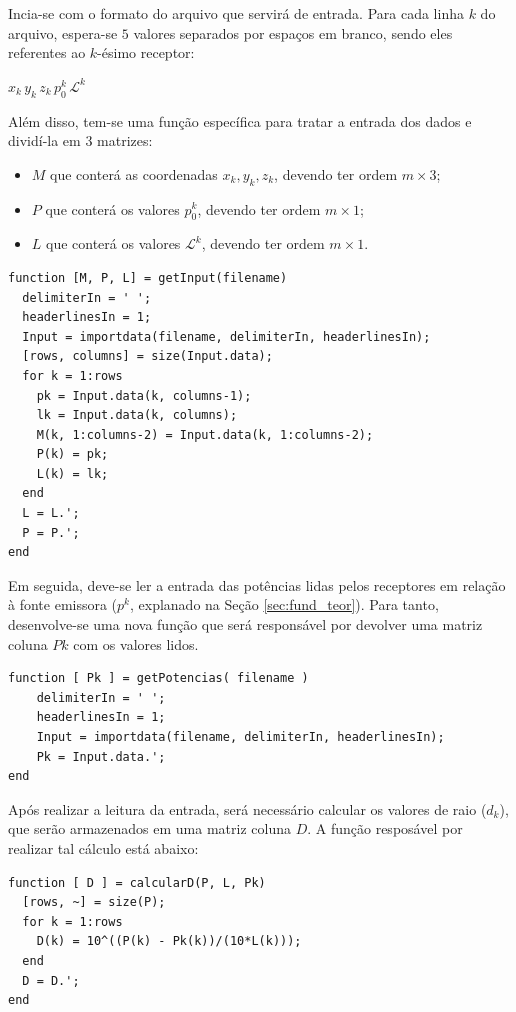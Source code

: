 	Incia-se com o formato do arquivo que servirá de entrada. Para cada linha $k$ do arquivo, espera-se
	$5$ valores separados por espaços em branco, sendo eles referentes ao $k$-ésimo receptor:

	$x_k\,y_k\,z_k\,p^k_0\,\mathcal{L}^k$

	Além disso, tem-se uma função específica para tratar a entrada dos dados e dividí-la em $3$ matrizes:
	\begin{itemize}
		\item $M$ que conterá as coordenadas $x_k, y_k, z_k$, devendo ter ordem $m\times3$;
		\item $P$ que conterá os valores $p^k_0$, devendo ter ordem $m\times1$;
		\item $L$ que conterá os valores $\mathcal{L}^k$, devendo ter ordem $m\times1$.
	\end{itemize}

	\begin{Verbatim}[fontsize=\footnotesize]
function [M, P, L] = getInput(filename)
  delimiterIn = ' ';
  headerlinesIn = 1;
  Input = importdata(filename, delimiterIn, headerlinesIn);
  [rows, columns] = size(Input.data);
  for k = 1:rows
    pk = Input.data(k, columns-1);
    lk = Input.data(k, columns);
    M(k, 1:columns-2) = Input.data(k, 1:columns-2);
    P(k) = pk;
    L(k) = lk;
  end
  L = L.';
  P = P.';
end
	\end{Verbatim}

	Em seguida, deve-se ler a entrada das potências lidas pelos receptores em relação à fonte emissora ($p^k$,
	explanado na Seção \ref{sec:fund_teor}). Para tanto, desenvolve-se uma nova função que será responsável
	por devolver uma matriz coluna $Pk$ com os valores lidos.

	\begin{Verbatim}[fontsize=\footnotesize]
function [ Pk ] = getPotencias( filename )
	delimiterIn = ' ';
	headerlinesIn = 1;
	Input = importdata(filename, delimiterIn, headerlinesIn);
	Pk = Input.data.';
end
	\end{Verbatim}

	Após realizar a leitura da entrada, será necessário calcular os valores de raio ($d_k$), que serão
	armazenados em uma matriz coluna $D$. A função resposável por realizar tal cálculo está abaixo:

	\begin{Verbatim}[fontsize=\footnotesize]
function [ D ] = calcularD(P, L, Pk)
  [rows, ~] = size(P);
  for k = 1:rows
    D(k) = 10^((P(k) - Pk(k))/(10*L(k)));
  end
  D = D.';
end
	\end{Verbatim}

